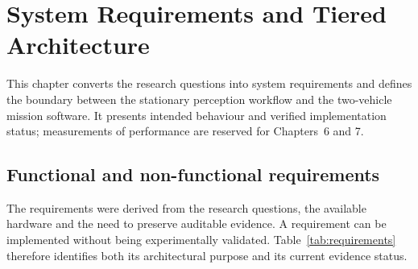 \chapter{System Requirements and Tiered Architecture}
\label{ch:architecture}

This chapter converts the research questions into system requirements and
defines the boundary between the stationary perception workflow and the
two-vehicle mission software. It presents intended behaviour and verified
implementation status; measurements of performance are reserved for
Chapters~6 and 7.

\section{Functional and non-functional requirements}
\label{sec:architecture:requirements}

The requirements were derived from the research questions, the available
hardware and the need to preserve auditable evidence. A requirement can be
implemented without being experimentally validated. Table~\ref{tab:requirements}
therefore identifies both its architectural purpose and its current evidence
status.

